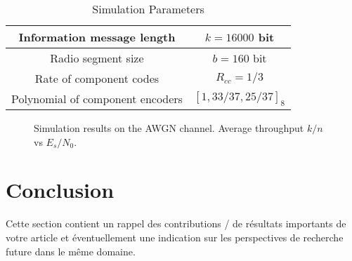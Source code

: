 \documentclass[journal, a4paper]{IEEEtran}
\begin{document}
	\begin{table}[!hbt]
		\begin{center}
		\caption{Simulation Parameters}
		\label{tab:simParameters}
		\begin{tabular}{|c|c|}
			\hline
			Information message length & $k=16000$ bit \\
			\hline
			Radio segment size & $b=160$ bit \\
			\hline
			Rate of component codes & $R_{cc}=1/3$\\
			\hline
			Polynomial of component encoders & $[1 , 33/37 , 25/37]_8$\\
			\hline
		\end{tabular}
		\end{center}
	\end{table}

	\begin{figure}[!hbt]
		\begin{center}
		\caption{Simulation results on the AWGN channel. Average throughput $k/n$ vs $E_s/N_0$.}
		\label{fig:tf_plot}
		\end{center}
	\end{figure}

\section{Conclusion}
Cette section contient un rappel des contributions / de résultats importants de votre article et éventuellement une indication sur les perspectives de recherche future dans le même domaine.
\end{document}

